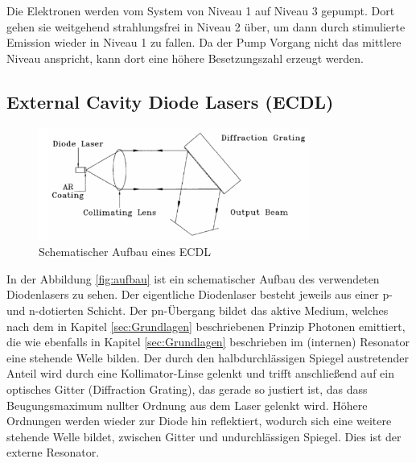 Die Elektronen werden vom System von Niveau 1 auf Niveau 3 gepumpt. 
Dort gehen sie weitgehend strahlungsfrei in Niveau 2 über, 
um dann durch stimulierte Emission wieder in Niveau 1 zu fallen.
Da der Pump Vorgang nicht das mittlere Niveau anspricht,
kann dort eine höhere Besetzungszahl erzeugt werden. 


\subsection{External Cavity Diode Lasers (ECDL)}
\begin{figure}[h]
    \centering
    \includegraphics[width=0.8\textwidth]{abb/Aufbau.png}
    \caption{Schematischer Aufbau eines ECDL \cite{laser}}
    \label{fig:aufbau}
\end{figure}
In der Abbildung \eqref{fig:aufbau} ist ein schematischer Aufbau des verwendeten Diodenlasers zu sehen.
Der eigentliche Diodenlaser besteht jeweils aus einer p- und n-dotierten Schicht.
Der pn-Übergang bildet das aktive Medium, 
welches nach dem in Kapitel \ref{sec:Grundlagen} beschriebenen Prinzip Photonen emittiert,
die wie ebenfalls in Kapitel \ref{sec:Grundlagen} beschrieben im (internen) Resonator eine stehende Welle bilden.
Der durch den halbdurchlässigen Spiegel austretender Anteil wird durch eine Kollimator-Linse gelenkt
und trifft anschließend auf ein optisches Gitter (Diffraction Grating),
das gerade so justiert ist, 
das dass Beugungsmaximum nullter Ordnung aus dem Laser gelenkt wird.
Höhere Ordnungen werden wieder zur Diode hin reflektiert,
wodurch sich eine weitere stehende Welle bildet, 
zwischen Gitter und undurchlässigen Spiegel.
Dies ist der externe Resonator.

